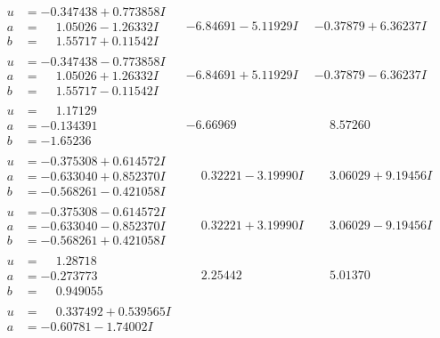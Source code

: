 \documentclass[1p]{elsarticle_modified}
\theoremstyle{definition}
\begin{document}
$$\begin{array}{c|c|c}
\begin{aligned}
u &= -0.347438 + 0.773858 I \\
a &= \phantom{-}1.05026 - 1.26332 I \\
b &= \phantom{-}1.55717 + 0.11542 I\end{aligned}
 & -6.84691 - 5.11929 I & -0.37879 + 6.36237 I \\ \hline\begin{aligned}
u &= -0.347438 - 0.773858 I \\
a &= \phantom{-}1.05026 + 1.26332 I \\
b &= \phantom{-}1.55717 - 0.11542 I\end{aligned}
 & -6.84691 + 5.11929 I & -0.37879 - 6.36237 I \\ \hline\begin{aligned}
u &= \phantom{-}1.17129\phantom{ +0.000000I} \\
a &= -0.134391\phantom{ +0.000000I} \\
b &= -1.65236\phantom{ +0.000000I}\end{aligned}
 & -6.66969\phantom{ +0.000000I} & \phantom{-}8.57260\phantom{ +0.000000I} \\ \hline\begin{aligned}
u &= -0.375308 + 0.614572 I \\
a &= -0.633040 + 0.852370 I \\
b &= -0.568261 - 0.421058 I\end{aligned}
 & \phantom{-}0.32221 - 3.19990 I & \phantom{-}3.06029 + 9.19456 I \\ \hline\begin{aligned}
u &= -0.375308 - 0.614572 I \\
a &= -0.633040 - 0.852370 I \\
b &= -0.568261 + 0.421058 I\end{aligned}
 & \phantom{-}0.32221 + 3.19990 I & \phantom{-}3.06029 - 9.19456 I \\ \hline\begin{aligned}
u &= \phantom{-}1.28718\phantom{ +0.000000I} \\
a &= -0.273773\phantom{ +0.000000I} \\
b &= \phantom{-}0.949055\phantom{ +0.000000I}\end{aligned}
 & \phantom{-}2.25442\phantom{ +0.000000I} & \phantom{-}5.01370\phantom{ +0.000000I} \\ \hline\begin{aligned}
u &= \phantom{-}0.337492 + 0.539565 I \\
a &= -0.60781 - 1.74002 I \\

\end{aligned}
\end{array}$$
\end{document}
